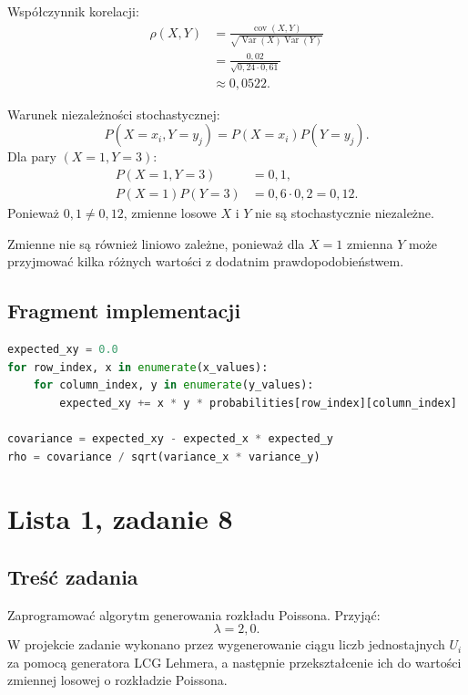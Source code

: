 \documentclass[12pt,a4paper]{article}
\begin{document}
Współczynnik korelacji:
\begin{align}
  \rho(X,Y) &= \frac{\operatorname{cov}(X,Y)}{\sqrt{\operatorname{Var}(X)\operatorname{Var}(Y)}}\\
  &= \frac{0{,}02}{\sqrt{0{,}24 \cdot 0{,}61}}\\
  &\approx 0{,}0522.
\end{align}

Warunek niezależności stochastycznej:
\begin{equation}
  P(X=x_i,Y=y_j) = P(X=x_i)P(Y=y_j).
\end{equation}
Dla pary $(X=1,Y=3)$:
\begin{align}
  P(X=1,Y=3) &= 0{,}1,\\
  P(X=1)P(Y=3) &= 0{,}6 \cdot 0{,}2 = 0{,}12.
\end{align}
Ponieważ $0{,}1 \neq 0{,}12$, zmienne losowe $X$ i $Y$ nie są stochastycznie niezależne.

Zmienne nie są również liniowo zależne, ponieważ dla $X=1$ zmienna $Y$ może przyjmować kilka różnych wartości z dodatnim prawdopodobieństwem.

\subsection{Fragment implementacji}

\begin{lstlisting}[language=Python]
expected_xy = 0.0
for row_index, x in enumerate(x_values):
    for column_index, y in enumerate(y_values):
        expected_xy += x * y * probabilities[row_index][column_index]

covariance = expected_xy - expected_x * expected_y
rho = covariance / sqrt(variance_x * variance_y)
\end{lstlisting}

\section{Lista 1, zadanie 8}

\subsection{Treść zadania}

Zaprogramować algorytm generowania rozkładu Poissona. Przyjąć:
\begin{equation}
  \lambda = 2{,}0.
\end{equation}
W projekcie zadanie wykonano przez wygenerowanie ciągu liczb jednostajnych $U_i$ za pomocą generatora LCG Lehmera, a następnie przekształcenie ich do wartości zmiennej losowej o rozkładzie Poissona.
\end{document}
